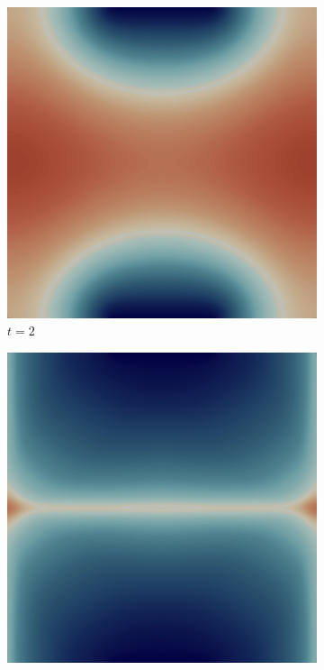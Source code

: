 \vfill\pagebreak

\begin{figure}[H]
    \centering
    \caption{Unit Square with Two Sinks Simulation: State Solution}
    \begin{subfigure}{.4\textwidth}
        \includegraphics[width=\textwidth]{imgs/UnitSquare2_State/first.png}
        \caption{$t = 2$}
    \end{subfigure}
    \begin{subfigure}{.4\textwidth}
        \includegraphics[width=\textwidth]{imgs/UnitSquare2_State/second.png}

\end{subfigure}
\end{figure}
